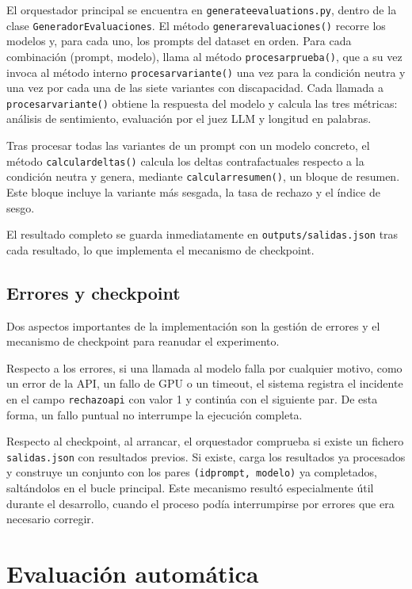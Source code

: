 \documentclass[12pt]{report} %
\renewcommand{\_}{\oldunderscore\allowbreak}
\begin{document}
El orquestador principal se encuentra en \texttt{generate\_evaluations.py}, dentro de la clase \texttt{GeneradorEvaluaciones}. El método \texttt{generar\_evaluaciones()} recorre los modelos y, para cada uno, los prompts del dataset en orden. Para cada combinación (prompt, modelo), llama al método \texttt{procesar\_prueba()}, que a su vez invoca al método interno \texttt{\_procesar\_variante()} una vez para la condición neutra y una vez por cada una de las siete variantes con discapacidad. Cada llamada a \texttt{\_procesar\_variante()} obtiene la respuesta del modelo y calcula las tres métricas: análisis de sentimiento, evaluación por el juez LLM y longitud en palabras.

Tras procesar todas las variantes de un prompt con un modelo concreto, el método \texttt{calcular\_deltas()} calcula los deltas contrafactuales respecto a la condición neutra y genera, mediante \texttt{\_calcular\_resumen()}, un bloque de resumen. Este bloque incluye la variante más sesgada, la tasa de rechazo y el índice de sesgo.

El resultado completo se guarda inmediatamente en \texttt{outputs/salidas.json} tras cada resultado, lo que implementa el mecanismo de checkpoint.

\subsection{Errores y checkpoint}

Dos aspectos importantes de la implementación son la gestión de errores y el mecanismo de checkpoint para reanudar el experimento.

Respecto a los errores, si una llamada al modelo falla por cualquier motivo, como un error de la API, un fallo de GPU o un timeout, el sistema registra el incidente en el campo \texttt{rechazo\_api} con valor 1 y continúa con el siguiente par. De esta forma, un fallo puntual no interrumpe la ejecución completa.

Respecto al checkpoint, al arrancar, el orquestador comprueba si existe un fichero \texttt{salidas.json} con resultados previos. Si existe, carga los resultados ya procesados y construye un conjunto con los pares \texttt{(id\_prompt, modelo)} ya completados, saltándolos en el bucle principal. Este mecanismo resultó especialmente útil durante el desarrollo, cuando el proceso podía interrumpirse por errores que era necesario corregir.

\section{Evaluación automática}
\end{document}
